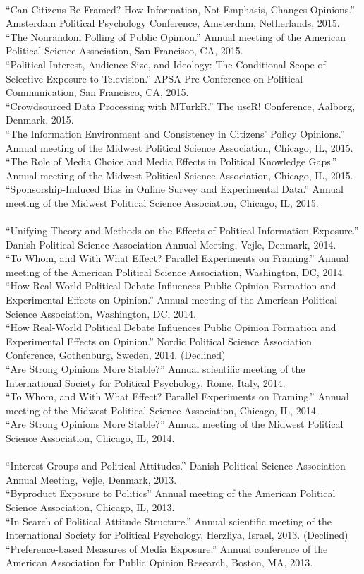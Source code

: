 \documentclass[12pt]{article}
\newcommand{\topic}[1]{\pagebreak[3]\indent {\color{lg}{\footnotesize #1 }}\\}
\newcommand{\entry}[1]{\indent {\color{lg}\guillemotright}\hspace{2pt}#1\vspace{.25em}\\}
\begin{document}
	\topic{Conference Papers (2015)}
	\entry{``Can Citizens Be Framed? How Information, Not Emphasis, Changes Opinions.'' Amsterdam Political Psychology Conference, Amsterdam, Netherlands, 2015.}
	\entry{``The Nonrandom Polling of Public Opinion.'' Annual meeting of the American Political Science Association, San Francisco, CA, 2015.}
	\entry{``Political Interest, Audience Size, and Ideology: The Conditional Scope of Selective Exposure to Television.'' APSA Pre-Conference on Political Communication, San Francisco, CA, 2015.}
	\entry{``Crowdsourced Data Processing with MTurkR.'' The useR! Conference, Aalborg, Denmark, 2015.}
	\entry{``The Information Environment and Consistency in Citizens' Policy Opinions.'' Annual meeting of the Midwest Political Science Association, Chicago, IL, 2015.}
	\entry{``The Role of Media Choice and Media Effects in Political Knowledge Gaps.'' Annual meeting of the Midwest Political Science Association, Chicago, IL, 2015.}
	\entry{``Sponsorship-Induced Bias in Online Survey and Experimental Data.'' Annual meeting of the Midwest Political Science Association, Chicago, IL, 2015.}
	
	\topic{Conference Papers (2014)}
	\entry{``Unifying Theory and Methods on the Effects of Political Information Exposure.'' Danish Political Science Association Annual Meeting, Vejle, Denmark, 2014.}
	\entry{``To Whom, and With What Effect? Parallel Experiments on Framing.'' Annual meeting of the American Political Science Association, Washington, DC, 2014.}
	\entry{``How Real-World Political Debate Influences Public Opinion Formation and Experimental Effects on Opinion.'' Annual meeting of the American Political Science Association, Washington, DC, 2014.}
	\entry{``How Real-World Political Debate Influences Public Opinion Formation and Experimental Effects on Opinion.'' Nordic Political Science Association Conference, Gothenburg, Sweden, 2014. (Declined)}
	\entry{``Are Strong Opinions More Stable?'' Annual scientific meeting of the International Society for Political Psychology, Rome, Italy, 2014.}
	\entry{``To Whom, and With What Effect? Parallel Experiments on Framing.'' Annual meeting of the Midwest Political Science Association, Chicago, IL, 2014.}
	\entry{``Are Strong Opinions More Stable?'' Annual meeting of the Midwest Political Science Association, Chicago, IL, 2014.}
	
	\topic{Conference Papers (2013)}
	\entry{``Interest Groups and Political Attitudes.'' Danish Political Science Association Annual Meeting, Vejle, Denmark, 2013.}
	\entry{``Byproduct Exposure to Politics'' Annual meeting of the American Political Science Association, Chicago, IL, 2013.}
	\entry{``In Search of Political Attitude Structure.'' Annual scientific meeting of the International Society for Political Psychology, Herzliya, Israel, 2013. (Declined)}
	\entry{``Preference-based Measures of Media Exposure.'' Annual conference of the American Association for Public Opinion Research, Boston, MA, 2013.}
	
\end{document}
